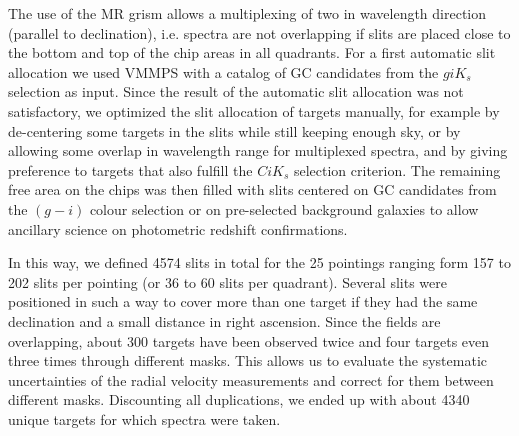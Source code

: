 \documentclass[useAMS,usenatbib]{mn2e}
\begin{document}
The use of the MR grism allows a multiplexing of two in wavelength direction (parallel to declination), i.e. spectra are not overlapping if slits are placed close to the bottom and top of the chip areas in all quadrants. 
For a first automatic slit allocation we used VMMPS with a catalog of GC candidates from the $giK_s$ selection as input. Since the result of the automatic slit allocation was not satisfactory, we optimized the slit allocation of targets manually, for example by de-centering some targets in the slits while still keeping enough sky, or by allowing some overlap in wavelength range for multiplexed spectra, and by giving preference to targets that also fulfill the $CiK_s$ selection criterion. The remaining free area on the chips was then filled with slits centered on GC candidates from the $(g-i)$ colour selection or on pre-selected background galaxies to allow ancillary science on photometric redshift confirmations.

In this way, we defined 4574 slits in total for the 25 pointings ranging form 157 to 202 slits per pointing (or 36 to 60 slits per quadrant). Several slits were positioned in such a way to cover more than one target if they had the same declination and a small distance in right ascension. Since the fields are overlapping, about 300 targets have been observed twice and four targets even three times through different masks. This allows us to evaluate the systematic uncertainties of the radial velocity measurements and correct for them between different masks. Discounting all duplications, we ended up with about 4340 unique targets
for which spectra were taken. 

\end{document}
